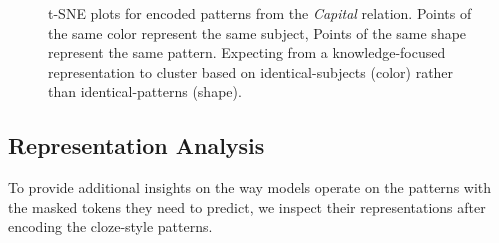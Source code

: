\begin{figure}[t!]
\centering

{}


\caption{t-SNE plots for encoded patterns from the \textit{Capital} relation. Points of the same color represent the same subject, Points of the same shape represent the same pattern. Expecting from a knowledge-focused representation to cluster based on identical-subjects (color) rather than identical-patterns (shape).}
\label{fig:tsne-emb}

\end{figure}

\subsection{Representation Analysis}


To provide additional insights on the way models operate on the patterns with the masked tokens they need to predict, we inspect their representations after encoding the cloze-style patterns.

